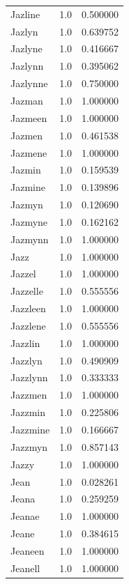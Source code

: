 \documentclass[
  letterpaper,
  DIV=11,
  numbers=noendperiod]{scrreprt}
\begin{document}
\begin{tabular}{lrr}
Jazline         &   1.0 &   0.500000 \\
Jazlyn          &   1.0 &   0.639752 \\
Jazlyne         &   1.0 &   0.416667 \\
Jazlynn         &   1.0 &   0.395062 \\
Jazlynne        &   1.0 &   0.750000 \\
Jazman          &   1.0 &   1.000000 \\
Jazmeen         &   1.0 &   1.000000 \\
Jazmen          &   1.0 &   0.461538 \\
Jazmene         &   1.0 &   1.000000 \\
Jazmin          &   1.0 &   0.159539 \\
Jazmine         &   1.0 &   0.139896 \\
Jazmyn          &   1.0 &   0.120690 \\
Jazmyne         &   1.0 &   0.162162 \\
Jazmynn         &   1.0 &   1.000000 \\
Jazz            &   1.0 &   1.000000 \\
Jazzel          &   1.0 &   1.000000 \\
Jazzelle        &   1.0 &   0.555556 \\
Jazzleen        &   1.0 &   1.000000 \\
Jazzlene        &   1.0 &   0.555556 \\
Jazzlin         &   1.0 &   1.000000 \\
Jazzlyn         &   1.0 &   0.490909 \\
Jazzlynn        &   1.0 &   0.333333 \\
Jazzmen         &   1.0 &   1.000000 \\
Jazzmin         &   1.0 &   0.225806 \\
Jazzmine        &   1.0 &   0.166667 \\
Jazzmyn         &   1.0 &   0.857143 \\
Jazzy           &   1.0 &   1.000000 \\
Jean            &   1.0 &   0.028261 \\
Jeana           &   1.0 &   0.259259 \\
Jeanae          &   1.0 &   1.000000 \\
Jeane           &   1.0 &   0.384615 \\
Jeaneen         &   1.0 &   1.000000 \\
Jeanell         &   1.0 &   1.000000 \\

\end{tabular}
\end{document}
